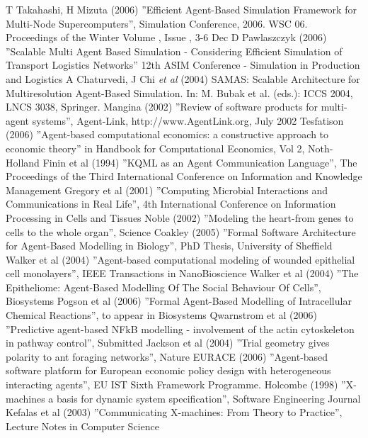 
\begin{thebibliography}{99}
 T Takahashi, H Mizuta (2006) ''Efficient Agent-Based Simulation Framework for Multi-Node Supercomputers'', Simulation Conference, 2006. WSC 06. Proceedings of the Winter Volume , Issue , 3-6 Dec
 D Pawlaszczyk (2006) ''Scalable Multi Agent Based Simulation - Considering Efficient Simulation of Transport Logistics Networks'' 12th ASIM Conference - Simulation in Production and Logistics
  A Chaturvedi, J Chi \textsl{et al} (2004) SAMAS: Scalable Architecture for Multiresolution Agent-Based Simulation. In: M. Bubak et al. (eds.): ICCS 2004,
LNCS 3038, Springer.
 Mangina (2002) ''Review of software products for multi-agent systems'', Agent-Link, http://www.AgentLink.org, July 2002
 Tesfatison (2006) ''Agent-based computational economics: a constructive approach to economic theory'' in Handbook for Computational Economics, Vol 2, Noth-Holland
 Finin et al (1994) ''KQML as an Agent Communication Language'', The Proceedings of  the Third International Conference on Information and Knowledge Management
 Gregory et al (2001)  ''Computing Microbial Interactions and Communications in Real Life'', 4th International Conference on Information Processing in Cells and Tissues
 Noble (2002)  ''Modeling the heart-from genes to cells to the whole organ'', Science
 Coakley  (2005) ''Formal Software Architecture for Agent-Based Modelling in Biology'', PhD Thesis, University of Sheffield
 Walker et al (2004) ''Agent-based computational modeling of wounded epithelial cell monolayers'', IEEE Transactions in NanoBioscience
 Walker et al (2004) ''The Epitheliome: Agent-Based Modelling Of The Social Behaviour Of Cells'', Biosystems
 Pogson  et al (2006) ''Formal Agent-Based Modelling of Intracellular Chemical Reactions'', to appear in Biosystems
 Qwarnstrom et al (2006) ''Predictive agent-based NFkB modelling - involvement of the actin cytoskeleton in pathway control'', Submitted
 Jackson et al (2004) ''Trial geometry gives polarity to ant foraging networks'', Nature
 EURACE (2006)  ''Agent-based software platform for European economic policy design with heterogeneous interacting agents'', EU IST Sixth Framework Programme.
 Holcombe (1998) ''X-machines a basis for dynamic system specification'', Software Engineering Journal
 Kefalas et al (2003) ''Communicating X-machines: From Theory to Practice'', Lecture Notes in Computer Science

\end{thebibliography}
